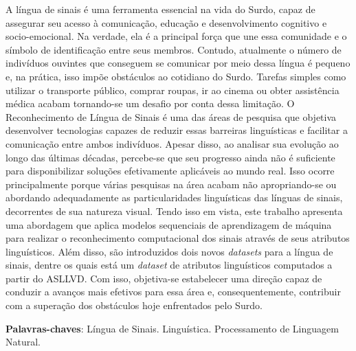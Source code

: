 \begin{resumo}[Resumo]
  \noindent
  A língua de sinais é uma ferramenta essencial na vida do Surdo, capaz de assegurar seu acesso à comunicação, educação e desenvolvimento cognitivo e socio-emocional.
  Na verdade, ela é a principal força que une essa comunidade e o símbolo de identificação entre seus membros.
  Contudo, atualmente o número de indivíduos ouvintes que conseguem se comunicar por meio dessa língua é pequeno e, na prática, isso impõe obstáculos ao cotidiano do Surdo.
  Tarefas simples como utilizar o transporte público, comprar roupas, ir ao cinema ou obter assistência médica acabam tornando-se um desafio por conta dessa limitação.
  O Reconhecimento de Língua de Sinais é uma das áreas de pesquisa que objetiva desenvolver tecnologias capazes de reduzir essas barreiras linguísticas e facilitar a comunicação entre ambos indivíduos.
  Apesar disso, ao analisar sua evolução ao longo das últimas décadas, percebe-se que seu progresso ainda não é suficiente para disponibilizar soluções efetivamente aplicáveis ao mundo real.
  Isso ocorre principalmente porque várias pesquisas na área acabam não apropriando-se ou abordando adequadamente as particularidades linguísticas das línguas de sinais, decorrentes de sua natureza visual.
  Tendo isso em vista, este trabalho apresenta uma abordagem que aplica modelos sequenciais de aprendizagem de máquina para realizar o reconhecimento computacional dos sinais através de seus atributos linguísticos. Além disso, são introduzidos dois novos \textit{datasets} para a língua de sinais, dentre os quais está um \textit{dataset} de atributos linguísticos computados a partir do ASLLVD.
  Com isso, objetiva-se estabelecer uma direção capaz de conduzir a avanços mais efetivos para essa área e, consequentemente, contribuir com a superação dos obstáculos hoje enfrentados pelo Surdo.

  \vspace{\onelineskip}

  \noindent
  \textbf{Palavras-chaves}: Língua de Sinais. Linguística. Processamento de Linguagem Natural.
\end{resumo}



